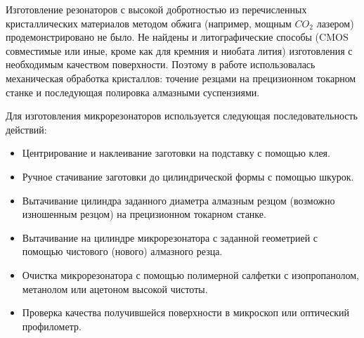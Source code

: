 Изготовление резонаторов с высокой добротностью из перечисленных кристаллических материалов методом обжига (например, мощным $CO_2$ лазером) продемонстрировано не было. Не найдены и литографические способы (CMOS совместимые или иные, кроме как для кремния и ниобата лития) изготовления с необходимым качеством поверхности. Поэтому в работе использовалась механическая обработка кристаллов: точение резцами на прецизионном токарном станке и последующая полировка алмазными суспензиями.

Для изготовления микрорезонаторов используется следующая последовательность действий:

\begin{itemize}
  \item Центрирование и наклеивание заготовки на подставку с помощью клея.
  \item Ручное стачивание заготовки до цилиндрической формы с помощью шкурок.
  \item Вытачивание цилиндра заданного диаметра алмазным резцом (возможно изношенным резцом) на прецизионном токарном станке.
  \item Вытачивание на цилиндре микрорезонатора с заданной геометрией с помощью чистового (нового) алмазного резца.
  \item Очистка микрорезонатора с помощью полимерной салфетки с изопропанолом, метанолом или ацетоном высокой чистоты.
  \item Проверка качества получившейся поверхности в микроскоп или оптический профилометр.
\end{itemize}

